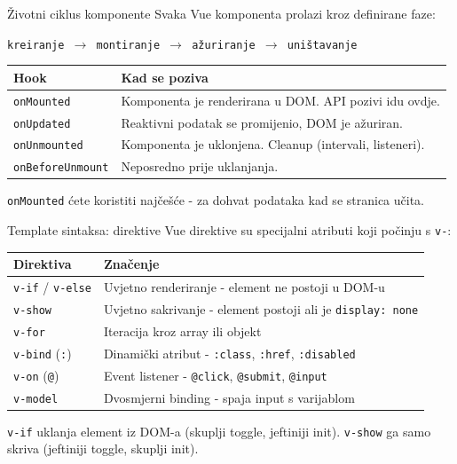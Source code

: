 \begin{frame}{Životni ciklus komponente}
Svaka Vue komponenta prolazi kroz definirane faze:

\vspace{0.4em}
\begin{center}
\texttt{kreiranje $\rightarrow$ montiranje $\rightarrow$ ažuriranje $\rightarrow$ uništavanje}
\end{center}

\vspace{0.6em}
\begin{tabular}{@{}ll@{}}
  \toprule
  \textbf{Hook} & \textbf{Kad se poziva} \\
  \midrule
  \texttt{onMounted} & Komponenta je renderirana u DOM. API pozivi idu ovdje. \\
  \texttt{onUpdated} & Reaktivni podatak se promijenio, DOM je ažuriran. \\
  \texttt{onUnmounted} & Komponenta je uklonjena. Cleanup (intervali, listeneri). \\
  \texttt{onBeforeUnmount} & Neposredno prije uklanjanja. \\
  \bottomrule
\end{tabular}

\vspace{0.4em}
\texttt{onMounted} ćete koristiti najčešće - za dohvat podataka kad se stranica učita.
\end{frame}

\begin{frame}{Template sintaksa: direktive}
Vue direktive su specijalni atributi koji počinju s \texttt{v-}:

\vspace{0.4em}
\begin{tabular}{@{}lp{8cm}@{}}
  \toprule
  \textbf{Direktiva} & \textbf{Značenje} \\
  \midrule
  \texttt{v-if} / \texttt{v-else} & Uvjetno renderiranje - element ne postoji u DOM-u \\
  \texttt{v-show} & Uvjetno sakrivanje - element postoji ali je \texttt{display: none} \\
  \texttt{v-for} & Iteracija kroz array ili objekt \\
  \texttt{v-bind} (\texttt{:}) & Dinamički atribut - \texttt{:class}, \texttt{:href}, \texttt{:disabled} \\
  \texttt{v-on} (\texttt{@}) & Event listener - \texttt{@click}, \texttt{@submit}, \texttt{@input} \\
  \texttt{v-model} & Dvosmjerni binding - spaja input s varijablom \\
  \bottomrule
\end{tabular}

\vspace{0.4em}
\texttt{v-if} uklanja element iz DOM-a (skuplji toggle, jeftiniji init). \texttt{v-show} ga samo skriva (jeftiniji toggle, skuplji init).
\end{frame}

